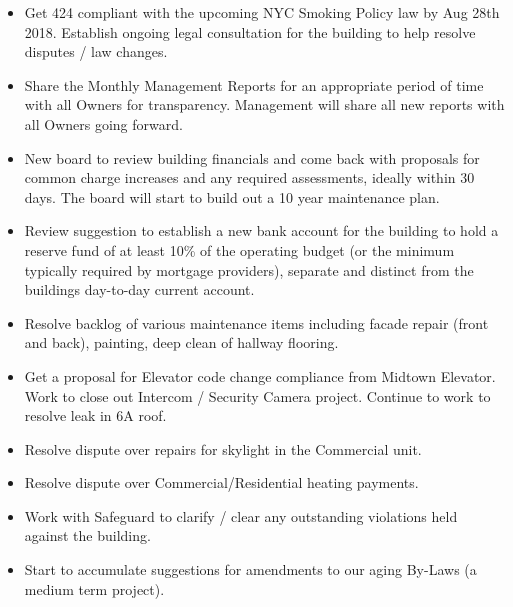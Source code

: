 \begin{itemize}
\item Get 424 compliant with the upcoming NYC Smoking Policy law by Aug 28th 2018.
Establish ongoing legal consultation for the building to help resolve disputes / 
law changes.

\item Share the Monthly Management Reports for an appropriate period of time with all 
Owners for transparency.  Management will share all new reports with all Owners 
going forward.

\item New board to review building financials and come back with proposals for common 
charge increases and any required assessments, ideally within 30 days.  
The board will start to build out a 10 year maintenance plan.

\item Review suggestion to establish a new bank account for the building to hold a 
reserve fund of at least 10\% of the operating budget (or the minimum typically 
required by mortgage providers), separate and distinct from the buildings 
day-to-day current account.

\item Resolve backlog of various maintenance items including facade repair (front and 
back), painting, deep clean of hallway flooring.  

\item Get a proposal for Elevator code change compliance from Midtown Elevator.
Work to close out Intercom / Security Camera project.
Continue to work to resolve leak in 6A roof.

\item Resolve dispute over repairs for skylight in the Commercial unit. 

\item Resolve dispute over Commercial/Residential heating payments.

\item Work with Safeguard to clarify / clear any outstanding violations held against 
the building.

\item Start to accumulate suggestions for amendments to our aging By-Laws (a medium 
term project).
\end{itemize}




